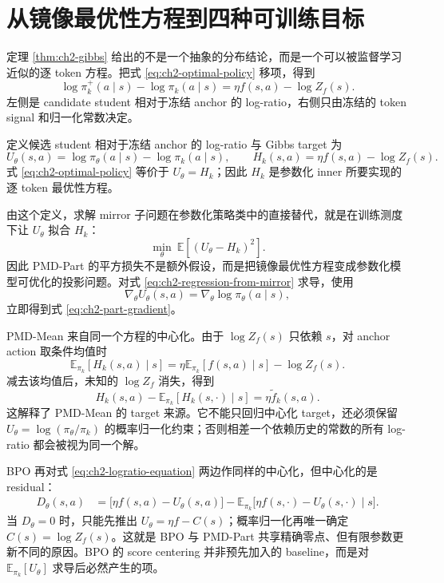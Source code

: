 \section{从镜像最优性方程到四种可训练目标}
\label{sec:ch2-objective-derivation}

定理 \ref{thm:ch2-gibbs} 给出的不是一个抽象的分布结论，而是一个可以被监督学习近似的逐 token 方程。把式 \eqref{eq:ch2-optimal-policy} 移项，得到
\begin{equation}
\label{eq:ch2-logratio-equation}
\log\pi_k^+(a\mid s)-\log\pi_k(a\mid s)
=\eta f(s,a)-\log Z_f(s).
\end{equation}
左侧是 candidate student 相对于冻结 anchor 的 log-ratio，右侧只由冻结的 token signal 和归一化常数决定。

\begin{definition}
\label{def:ch2-logratio-target}
定义候选 student 相对于冻结 anchor 的 log-ratio 与 Gibbs target 为
\[
U_\theta(s,a)=\log\pi_\theta(a\mid s)-\log\pi_k(a\mid s),
\qquad
H_k(s,a)=\eta f(s,a)-\log Z_f(s).
\]
式 \eqref{eq:ch2-optimal-policy} 等价于 $U_\theta=H_k$；因此 $H_k$ 是参数化 inner 所要实现的逐 token 最优性方程。
\end{definition}

由这个定义，求解 mirror 子问题在参数化策略类中的直接替代，就是在训练测度下让 $U_\theta$ 拟合 $H_k$：
\begin{equation}
\label{eq:ch2-regression-from-mirror}
\min_\theta\ \mathbb E\left[(U_\theta-H_k)^2\right].
\end{equation}
因此 PMD-Part 的平方损失不是额外假设，而是把镜像最优性方程变成参数化模型可优化的投影问题。对式 \eqref{eq:ch2-regression-from-mirror} 求导，使用
\[
\nabla_\theta U_\theta(s,a)=\nabla_\theta\log\pi_\theta(a\mid s),
\]
立即得到式 \eqref{eq:ch2-part-gradient}。

PMD-Mean 来自同一个方程的中心化。由于 $\log Z_f(s)$ 只依赖 $s$，对 anchor action 取条件均值时
\[
\mathbb E_{\pi_k}[H_k(s,a)\mid s]
=\eta\mathbb E_{\pi_k}[f(s,a)\mid s]-\log Z_f(s).
\]
减去该均值后，未知的 $\log Z_f$ 消失，得到
\begin{equation}
\label{eq:ch2-centered-logratio-equation}
H_k(s,a)-\mathbb E_{\pi_k}[H_k(s,\cdot)\mid s]
=\eta\widetilde f_k(s,a).
\end{equation}
这解释了 PMD-Mean 的 target 来源。它不能只回归中心化 target，还必须保留 $U_\theta=\log(\pi_\theta/\pi_k)$ 的概率归一化约束；否则相差一个依赖历史的常数的所有 log-ratio 都会被视为同一个解。

BPO 再对式 \eqref{eq:ch2-logratio-equation} 两边作同样的中心化，但中心化的是 residual：
\begin{align}
D_\theta(s,a)
&=\bigl[\eta f(s,a)-U_\theta(s,a)\bigr]
-\mathbb E_{\pi_k}\bigl[\eta f(s,\cdot)-U_\theta(s,\cdot)\mid s\bigr].
\label{eq:ch2-bpo-from-optimality}
\end{align}
当 $D_\theta=0$ 时，只能先推出 $U_\theta=\eta f-C(s)$；概率归一化再唯一确定 $C(s)=\log Z_f(s)$。这就是 BPO 与 PMD-Part 共享精确零点、但有限参数更新不同的原因。BPO 的 score centering 并非预先加入的 baseline，而是对 $\mathbb E_{\pi_k}[U_\theta]$ 求导后必然产生的项。

